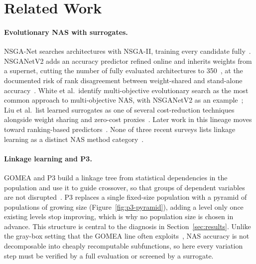 \section{Related Work}
\label{sec:related-work}

\paragraph{Evolutionary NAS with surrogates.} NSGA-Net searches architectures with NSGA-II, training every
candidate fully~\citep{lu2019nsganet}. NSGANetV2 adds an accuracy predictor refined online and inherits weights
from a supernet, cutting the number of fully evaluated architectures to 350~\citep{lu2020nsganetv2}, at the
documented risk of rank disagreement between weight-shared and stand-alone accuracy~\citep{yu2020evaluatingnas}.
White et al.\ identify multi-objective evolutionary search as the most common approach to multi-objective NAS,
with NSGANetV2 as an example~\citep{white2023insights}; Liu et al.\ list learned surrogates as one of several
cost-reduction techniques alongside weight sharing and zero-cost proxies~\citep{liu2023survey}. Later work in
this lineage moves toward ranking-based predictors~\citep{lu2022mosegnas}. None of three recent surveys lists
linkage learning as a distinct NAS method category~\citep{liu2023survey,white2023insights,ozcelik2026survey}.

\paragraph{Linkage learning and P3.} GOMEA and P3 build a linkage tree from statistical dependencies in the
population and use it to guide crossover, so that groups of dependent variables are not
disrupted~\citep{thierens2011optimal,goldman2014parameterless}. P3 replaces a single fixed-size population with
a pyramid of populations of growing size (Figure~\ref{fig:p3-pyramid}), adding a level only once existing levels
stop improving, which is why no population size is chosen in advance. This structure is central to the
diagnosis in Section~\ref{sec:results}. Unlike the gray-box setting that the GOMEA line often
exploits~\citep{whitley2016graybox,bouter2023library}, NAS accuracy is not decomposable into cheaply recomputable
subfunctions, so here every variation step must be verified by a full evaluation or screened by a surrogate.

